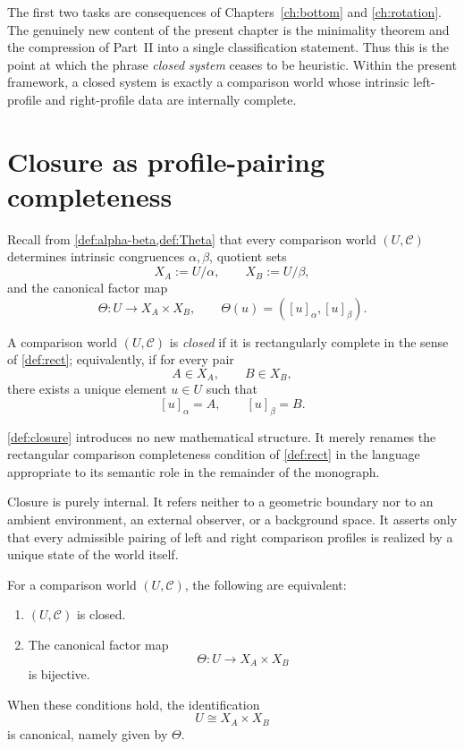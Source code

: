 The first two tasks are consequences of Chapters~\ref{ch:bottom} and
\ref{ch:rotation}. The genuinely new content of the present chapter is
the minimality theorem and the compression of Part~II into a single
classification statement.
Thus this is the point at which the phrase \emph{closed system} ceases
to be heuristic. Within the present framework, a closed system is
exactly a comparison world whose intrinsic left-profile and right-profile
data are internally complete.
\section{Closure as profile-pairing completeness}
\label{sec:closure-profile}
Recall from \cref{def:alpha-beta,def:Theta} that every comparison world
\((U,\mathcal C)\) determines intrinsic congruences \(\alpha,\beta\),
quotient sets
\[
	X_A:=U/\alpha,
	\qquad
	X_B:=U/\beta,
\]
and the canonical factor map
\[
	\Theta:U\to X_A\times X_B,
	\qquad
	\Theta(u)=([u]_\alpha,[u]_\beta).
\]
\begin{definition}[Closure]
	\label{def:closure}
	A comparison world \((U,\mathcal C)\) is \emph{closed} if it is
	rectangularly complete in the sense of \cref{def:rect}; equivalently, if
	for every pair
	\[
		A\in X_A,
		\qquad
		B\in X_B,
	\]
	there exists a unique element \(u\in U\) such that
	\[
		[u]_\alpha=A,
		\qquad
		[u]_\beta=B.
	\]
\end{definition}
\begin{remark}
	\cref{def:closure} introduces no new mathematical structure. It merely
	renames the rectangular comparison completeness condition of
	\cref{def:rect} in the language appropriate to its semantic role in the
	remainder of the monograph.
\end{remark}
\begin{remark}
	Closure is purely internal. It refers neither to a geometric boundary
	nor to an ambient environment, an external observer, or a background
	space. It asserts only that every admissible pairing of left and right
	comparison profiles is realized by a unique state of the world itself.
\end{remark}
\begin{proposition}
	\label{prop:closure-bijective}
	For a comparison world \((U,\mathcal C)\), the following are equivalent:
	\begin{enumerate}[label=\textup{(\roman*)}]
		\item \((U,\mathcal C)\) is closed.
		\item The canonical factor map
		      \[
			      \Theta:U\to X_A\times X_B
		      \]
		      is bijective.
	\end{enumerate}
	When these conditions hold, the identification
	\[
		U\cong X_A\times X_B
	\]
	is canonical, namely given by \(\Theta\).
\end{proposition}
